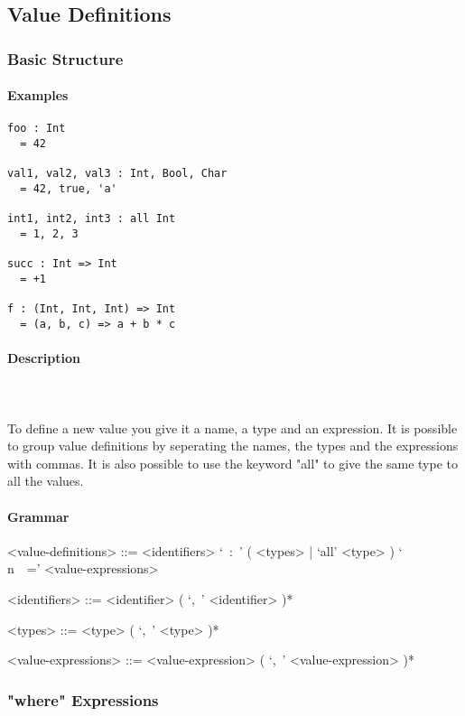 \documentclass{article}
\def\pend{\mbox{} \\\\}
\begin{document}
\subsection{Value Definitions}
\label{subsec:valdefs}

\subsubsection{Basic Structure}
\paragraph{Examples}

\begin{verbatim}
foo : Int
  = 42

val1, val2, val3 : Int, Bool, Char
  = 42, true, 'a'

int1, int2, int3 : all Int
  = 1, 2, 3

succ : Int => Int
  = +1

f : (Int, Int, Int) => Int
  = (a, b, c) => a + b * c
\end{verbatim}

\paragraph{Description}\pend
To define a new value you give it a name, a type and an expression. It is possible
to group value definitions by seperating the names, the types and the expressions
with commas. It is also possible to use the keyword "all" to give the same type
to all the values.

\paragraph{Grammar}
\begin{grammar}
<value-definitions> ::=
<identifiers> `\ :\ ' ( <types> | `all' <type> ) `\\n\ \ =' <value-expressions>

<identifiers> ::= <identifier> ( `,\ ' <identifier> )*  

<types> ::= <type> ( `,\ ' <type> )*  

<value-expressions> ::= <value-expression> ( `,\ ' <value-expression> )*  
\end{grammar}

\subsubsection{"where" Expressions}
\end{document}
